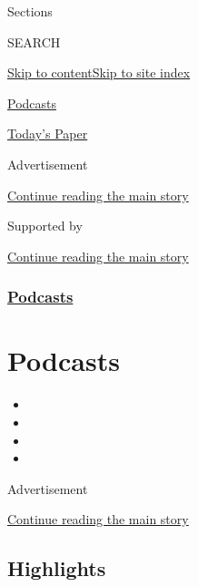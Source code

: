 Sections

SEARCH

\protect\hyperlink{site-content}{Skip to
content}\protect\hyperlink{site-index}{Skip to site index}

\href{https://www.nytimes3xbfgragh.onion/spotlight/podcasts}{Podcasts}

\href{https://myaccount.nytimes3xbfgragh.onion/auth/login?response_type=cookie\&client_id=vi}{}

\href{https://www.nytimes3xbfgragh.onion/section/todayspaper}{Today's
Paper}

Advertisement

\protect\hyperlink{after-top}{Continue reading the main story}

Supported by

\protect\hyperlink{after-sponsor}{Continue reading the main story}

\hypertarget{podcasts}{%
\subsubsection{\texorpdfstring{\href{/spotlight/podcasts}{Podcasts}}{Podcasts}}\label{podcasts}}

\hypertarget{podcasts-1}{%
\section{Podcasts}\label{podcasts-1}}

\begin{itemize}
\item
\item
\item
\item
\end{itemize}

Advertisement

\protect\hyperlink{after-subheader}{Continue reading the main story}

\hypertarget{highlights}{%
\subsection{Highlights}\label{highlights}}

